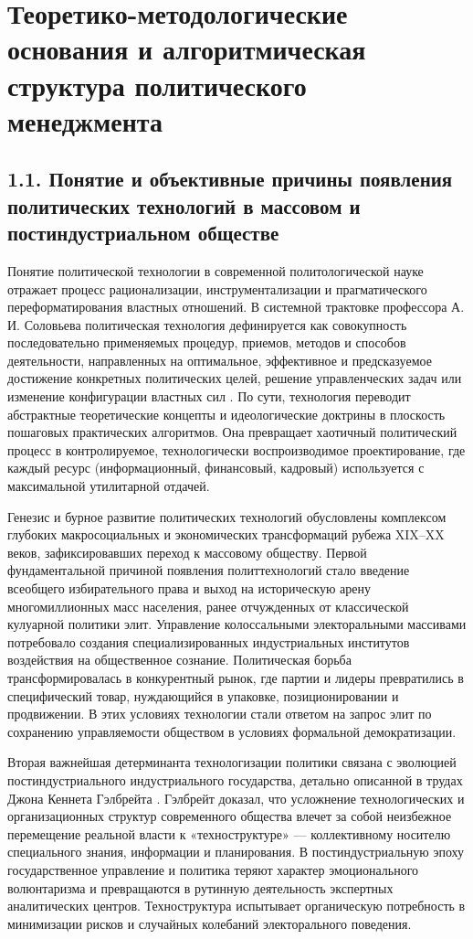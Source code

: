 \section{Теоретико-методологические основания и алгоритмическая структура политического менеджмента}

\subsection{1.1. Понятие и объективные причины появления политических технологий в массовом и постиндустриальном обществе}

Понятие политической технологии в современной политологической науке отражает процесс рационализации, инструментализации и прагматического переформатирования властных отношений. В системной трактовке профессора А. И. Соловьева политическая технология дефинируется как совокупность последовательно применяемых процедур, приемов, методов и способов деятельности, направленных на оптимальное, эффективное и предсказуемое достижение конкретных политических целей, решение управленческих задач или изменение конфигурации властных сил \cite{Solovyev}. По сути, технология переводит абстрактные теоретические концепты и идеологические доктрины в плоскость пошаговых практических алгоритмов. Она превращает хаотичный политический процесс в контролируемое, технологически воспроизводимое проектирование, где каждый ресурс (информационный, финансовый, кадровый) используется с максимальной утилитарной отдачей.

Генезис и бурное развитие политических технологий обусловлены комплексом глубоких макросоциальных и экономических трансформаций рубежа XIX–XX веков, зафиксировавших переход к массовому обществу. Первой фундаментальной причиной появления политтехнологий стало введение всеобщего избирательного права и выход на историческую арену многомиллионных масс населения, ранее отчужденных от классической кулуарной политики элит. Управление колоссальными электоральными массивами потребовало создания специализированных индустриальных институтов воздействия на общественное сознание. Политическая борьба трансформировалась в конкурентный рынок, где партии и лидеры превратились в специфический товар, нуждающийся в упаковке, позиционировании и продвижении. В этих условиях технологии стали ответом на запрос элит по сохранению управляемости обществом в условиях формальной демократизации.

Вторая важнейшая детерминанта технологизации политики связана с эволюцией постиндустриального индустриального государства, детально описанной в трудах Джона Кеннета Гэлбрейта \cite{Gelbreyt}. Гэлбрейт доказал, что усложнение технологических и организационных структур современного общества влечет за собой неизбежное перемещение реальной власти к «техноструктуре» — коллективному носителю специального знания, информации и планирования. В постиндустриальную эпоху государственное управление и политика теряют характер эмоционального волюнтаризма и превращаются в рутинную деятельность экспертных аналитических центров. Техноструктура испытывает органическую потребность в минимизации рисков и случайных колебаний электорального поведения. 

